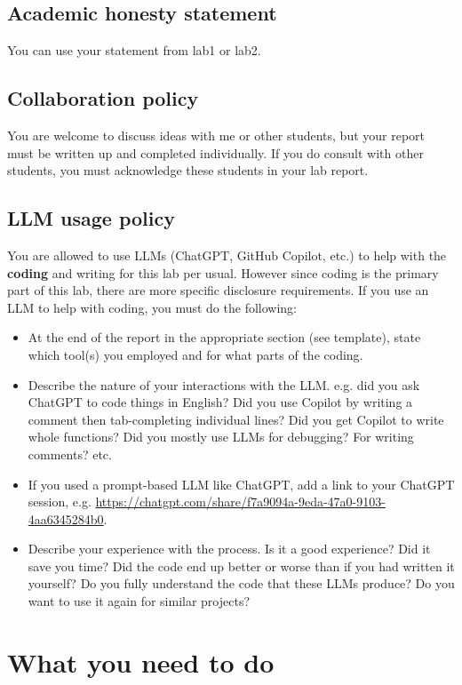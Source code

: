 \documentclass[letterpaper,12pt]{article}
\begin{document}
\subsection{Academic honesty statement}

You can use your statement from lab1 or lab2.

\subsection{Collaboration policy}

You are welcome to discuss ideas with me or other students, but your report must be written up and completed individually. If you do consult with other students, you must acknowledge these students in your lab report.

\subsection{LLM usage policy}

You are allowed to use LLMs (ChatGPT, GitHub Copilot, etc.) to help with the \textbf{coding} and writing for this lab per usual. However since coding is the primary part of this lab, there are more specific disclosure requirements.  If you use an LLM to help with coding, you must do the following:
\begin{itemize}
    \item At the end of the report in the appropriate section (see template), state which tool(s) you employed and for what parts of the coding.
    \item Describe the nature of your interactions with the LLM. e.g. did you ask ChatGPT to code things in English? Did you use Copilot by writing a comment then tab-completing individual lines? Did you get Copilot to write whole functions? Did you mostly use LLMs for debugging? For writing comments? etc.
    \item If you used a prompt-based LLM like ChatGPT, add a link to your ChatGPT session, e.g. \url{https://chatgpt.com/share/f7a9094a-9eda-47a0-9103-4aa6345284b0}.
    \item Describe your experience with the process. Is it a good experience? Did it save you time? Did the code end up better or worse than if you had written it yourself? Do you fully understand the code that these LLMs produce? Do you want to use it again for similar projects?
\end{itemize}


\section{What you need to do}
\end{document}
